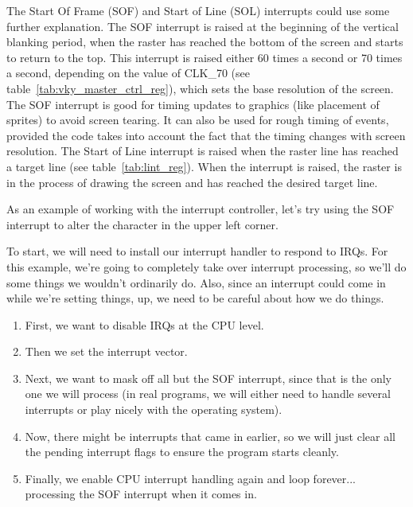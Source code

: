 The Start Of Frame (SOF) and Start of Line (SOL) interrupts could use some further explanation. The SOF interrupt is raised at the beginning of the vertical blanking period, when the raster has reached the bottom of the screen and starts to return to the top. This interrupt is raised either 60 times a second or 70 times a second, depending on the value of CLK\_70 (see table~\ref{tab:vky_master_ctrl_reg}), which sets the base resolution of the screen. The SOF interrupt is good for timing updates to graphics (like placement of sprites) to avoid screen tearing. It can also be used for rough timing of events, provided the code takes into account the fact that the timing changes with screen resolution. The Start of Line interrupt is raised when the raster line has reached a target line (see table~\ref{tab:lint_reg}). When the interrupt is raised, the raster is in the process of drawing the screen and has reached the desired target line.

As an example of working with the interrupt controller, let's try using the SOF interrupt to alter the character in the upper left corner.

To start, we will need to install our interrupt handler to respond to IRQs. For this example, we're going to completely take over interrupt processing, so we'll do some things we wouldn't ordinarily do. Also, since an interrupt could come in while we're setting things, up, we need to be careful about how we do things.

\begin{enumerate}
    \item First, we want to disable IRQs at the CPU level.
    \item Then we set the interrupt vector.
    \item Next, we want to mask off all but the SOF interrupt, since that is the only one we will process (in real programs, we will either need to handle several interrupts or play nicely with the operating system).
    \item Now, there might be interrupts that came in earlier, so we will just clear all the pending interrupt flags to ensure the program starts cleanly.
    \item Finally, we enable CPU interrupt handling again and loop forever... processing the SOF interrupt when it comes in.
\end{enumerate}

